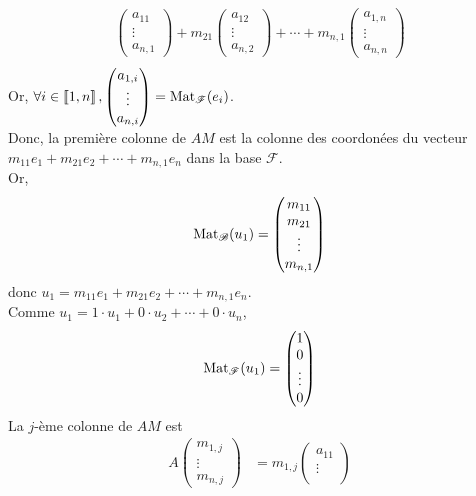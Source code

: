 \begin{prv}
\begin{enumerate}
\begin{align*}
\begin{pmatrix}
					a_{11}\\
					\vdots\\
					a_{n,1}
				\end{pmatrix} + m_{21} \begin{pmatrix}
					a_{12}\\
					\vdots\\
					a_{n,2}
				\end{pmatrix} + \cdots + m_{n,1} \begin{pmatrix}
					a_{1,n}\\
					\vdots\\
					a_{n,n}
				\end{pmatrix} \\
			\end{align*}
			Or, $\forall i \in \left\llbracket 1,n \right\rrbracket, \begin{pmatrix}
				a_{1,i}\\
				\vdots\\
				a_{n,i}
			\end{pmatrix} = \operatorname{Mat}_\mathcal{F}(e_i)$.\\
			Donc, la première colonne de $AM$ est la colonne des coordonées du vecteur $m_{11}e_1 + m_{21}e_2+\cdots+m_{n,1}e_n$ dans la base $\mathcal{F}$.\\
			Or, \[
				\operatorname{Mat}_{\mathcal{B}}(u_1) = \begin{pmatrix}
					m_{11}\\
					m_{21}\\
					\vdots\\
					m_{n,1}
				\end{pmatrix}
			\] donc $u_1 = m_{11}e_1 + m_{21}e_2 + \cdots + m_{n,1}e_n$.\\
			Comme $u_1 = 1 \cdot u_1 + 0\cdot u_2 + \cdots + 0 \cdot u_n$, \[
				\operatorname{Mat}_{\mathcal{F}}(u_1) = \begin{pmatrix}
					1\\
					0\\
					\vdots\\
					0
				\end{pmatrix}
			\] 
			La $j$-ème colonne de $AM$ est 
			\begin{align*}
				A \begin{pmatrix}
					m_{1,j}\\
					\vdots\\
					m_{n,j}
				\end{pmatrix} &=  m_{1,j} \begin{pmatrix}
					a_{11}\\
					\vdots\\

\end{pmatrix}
\end{align*}
\end{enumerate}
\end{prv}
